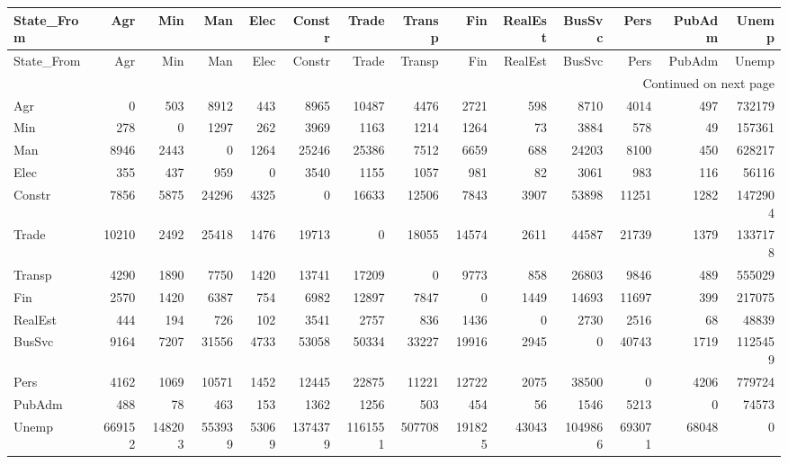 \begin{longtable}{lrrrrrrrrrrrrr}
\toprule
State_From & Agr & Min & Man & Elec & Constr & Trade & Transp & Fin & RealEst & BusSvc & Pers & PubAdm & Unemp \\
\midrule
\endfirsthead
\toprule
State_From & Agr & Min & Man & Elec & Constr & Trade & Transp & Fin & RealEst & BusSvc & Pers & PubAdm & Unemp \\
\midrule
\endhead
\midrule
\multicolumn{14}{r}{Continued on next page} \\
\midrule
\endfoot
\bottomrule
\endlastfoot
Agr & 0 & 503 & 8912 & 443 & 8965 & 10487 & 4476 & 2721 & 598 & 8710 & 4014 & 497 & 732179 \\
Min & 278 & 0 & 1297 & 262 & 3969 & 1163 & 1214 & 1264 & 73 & 3884 & 578 & 49 & 157361 \\
Man & 8946 & 2443 & 0 & 1264 & 25246 & 25386 & 7512 & 6659 & 688 & 24203 & 8100 & 450 & 628217 \\
Elec & 355 & 437 & 959 & 0 & 3540 & 1155 & 1057 & 981 & 82 & 3061 & 983 & 116 & 56116 \\
Constr & 7856 & 5875 & 24296 & 4325 & 0 & 16633 & 12506 & 7843 & 3907 & 53898 & 11251 & 1282 & 1472904 \\
Trade & 10210 & 2492 & 25418 & 1476 & 19713 & 0 & 18055 & 14574 & 2611 & 44587 & 21739 & 1379 & 1337178 \\
Transp & 4290 & 1890 & 7750 & 1420 & 13741 & 17209 & 0 & 9773 & 858 & 26803 & 9846 & 489 & 555029 \\
Fin & 2570 & 1420 & 6387 & 754 & 6982 & 12897 & 7847 & 0 & 1449 & 14693 & 11697 & 399 & 217075 \\
RealEst & 444 & 194 & 726 & 102 & 3541 & 2757 & 836 & 1436 & 0 & 2730 & 2516 & 68 & 48839 \\
BusSvc & 9164 & 7207 & 31556 & 4733 & 53058 & 50334 & 33227 & 19916 & 2945 & 0 & 40743 & 1719 & 1125459 \\
Pers & 4162 & 1069 & 10571 & 1452 & 12445 & 22875 & 11221 & 12722 & 2075 & 38500 & 0 & 4206 & 779724 \\
PubAdm & 488 & 78 & 463 & 153 & 1362 & 1256 & 503 & 454 & 56 & 1546 & 5213 & 0 & 74573 \\
Unemp & 669152 & 148203 & 553939 & 53069 & 1374379 & 1161551 & 507708 & 191825 & 43043 & 1049866 & 693071 & 68048 & 0 \\
\end{longtable}
